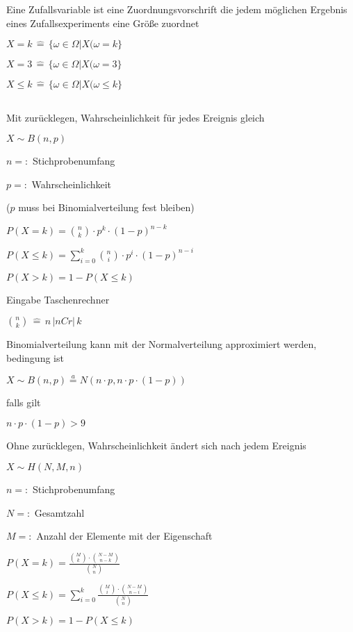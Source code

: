 \documentclass[10pt,a4paper,landscape]{article}
\begin{document}
\begin{multicols*}{4}
\parbox{\columnwidth}{\centering Eine Zufallsvariable ist eine Zuordnungsvorschrift die jedem  möglichen Ergebnis eines Zufallsexperiments eine Größe zuordnet}
\parbox{\columnwidth}{\centering $X = k \, \widehat{=} \, \{ \omega \in \Omega \vert X( \omega = k \}$}
\parbox{\columnwidth}{\centering $X = 3 \, \widehat{=} \, \{ \omega \in \Omega \vert X( \omega = 3 \}$}
\parbox{\columnwidth}{\centering $X \leq k \, \widehat{=} \, \{ \omega \in \Omega \vert X( \omega \leq k \}$}

\subsection{\noindent{}}

\noindent{}
\parbox{\columnwidth}{\centering Mit zurücklegen, Wahrscheinlichkeit für jedes Ereignis gleich }
\parbox{\columnwidth}{\centering $X \sim B(n,p)$}
\parbox{\columnwidth}{\centering $n =:$ Stichprobenumfang}
\parbox{\columnwidth}{\centering $p =:$ Wahrscheinlichkeit}
\parbox{\columnwidth}{\centering ($p$ muss bei Binomialverteilung fest bleiben)}
\parbox{\columnwidth}{\centering $P(X=k) = \binom{n}{k} \cdot p^k \cdot (1-p)^{n-k}$}
\parbox{\columnwidth}{\centering $P(X \leq k) = \sum \limits_{i=0}^k\binom{n}{i} \cdot p^i \cdot (1-p)^{n-i}$}
\parbox{\columnwidth}{\centering $P(X > k) = 1 - P(X \leq k)$}
\parbox{\columnwidth}{\centering Eingabe Taschenrechner}
\parbox{\columnwidth}{\centering $\binom{n}{k} \, \widehat{=} \, n \, \vert nCr \vert \, k$}
\parbox{\columnwidth}{\centering Binomialverteilung kann mit der Normalverteilung approximiert werden, bedingung ist}
\parbox{\columnwidth}{\centering $X \sim B(n, p) \stackrel{a}{=} N(n \cdot p, n \cdot p \cdot (1-p))$}
\parbox{\columnwidth}{\centering falls gilt}
\parbox{\columnwidth}{\centering $n \cdot p \cdot (1-p) > 9$}

\noindent{}
\parbox{\columnwidth}{\centering Ohne zurücklegen, Wahrscheinlichkeit ändert sich nach jedem Ereignis}
\parbox{\columnwidth}{\centering $X \sim H(N, M, n)$}
\parbox{\columnwidth}{\centering $n =:$ Stichprobenumfang}
\parbox{\columnwidth}{\centering $N =:$ Gesamtzahl}
\parbox{\columnwidth}{\centering $M =:$ Anzahl der Elemente mit der Eigenschaft}
\parbox{\columnwidth}{\centering $P(X = k) = \frac{\binom{M}{k} \cdot \binom{N-M}{n-k}}{\binom{N}{n}} $}
\parbox{\columnwidth}{\centering $P(X \leq k) = \sum \limits_{i=0}^k \frac{\binom{M}{i} \cdot \binom{N-M}{n-i}}{\binom{N}{n}} $}
\parbox{\columnwidth}{\centering $P(X > k) = 1 - P(X \leq k)$}


\end{multicols*}
\end{document}
